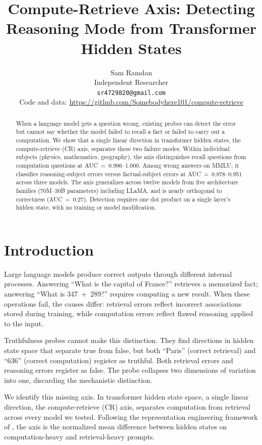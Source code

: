 \documentclass[11pt]{article}
\title{Compute-Retrieve Axis: Detecting Reasoning Mode from Transformer Hidden States}
\author{
  Sam Ramdan\\
  Independent Researcher\\
  \texttt{sr4729820@gmail.com}\\[4pt]
  {\small Code and data: \url{https://github.com/Somebodyhere101/compute-retrieve}}
}
\begin{document}
\maketitle

\begin{abstract}
When a language model gets a question wrong, existing probes can detect the error but cannot say whether the model failed to recall a fact or failed to carry out a computation. We show that a single linear direction in transformer hidden states, the compute-retrieve (CR) axis, separates these two failure modes. Within individual subjects (physics, mathematics, geography), the axis distinguishes recall questions from computation questions at AUC~=~0.996--1.000. Among wrong answers on MMLU, it classifies reasoning-subject errors versus factual-subject errors at AUC~=~0.878--0.951 across three models. The axis generalizes across twelve models from five architecture families (70M--30B parameters) including LLaMA, and is nearly orthogonal to correctness (AUC~=~0.27). Detection requires one dot product on a single layer's hidden state, with no training or model modification.
\end{abstract}

\section{Introduction}

Large language models produce correct outputs through different internal processes. Answering ``What is the capital of France?'' retrieves a memorized fact; answering ``What is 347~+~289?'' requires computing a new result. When these operations fail, the causes differ: retrieval errors reflect incorrect associations stored during training, while computation errors reflect flawed reasoning applied to the input.

Truthfulness probes \citep{li2023iti, burns2022discovering, marks2024geometry} cannot make this distinction. They find directions in hidden state space that separate true from false, but both ``Paris'' (correct retrieval) and ``636'' (correct computation) register as truthful. Both retrieval errors and reasoning errors register as false. The probe collapses two dimensions of variation into one, discarding the mechanistic distinction.

We identify this missing axis. In transformer hidden state space, a single linear direction, the compute-retrieve (CR) axis, separates computation from retrieval across every model we tested. Following the representation engineering framework of \citet{zou2023representation}, the axis is the normalized mean difference between hidden states on computation-heavy and retrieval-heavy prompts.
\end{document}
